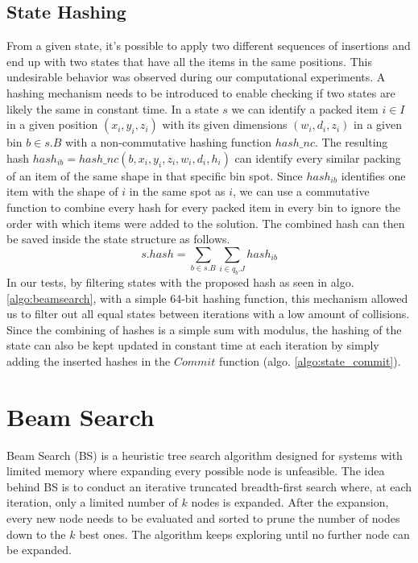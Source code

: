 \subsection{State Hashing}
\label{sec:state_uniqueness}%
From a given state, it's possible to apply two different sequences of insertions and end up with two states that have all the items in the same positions.
This undesirable behavior was observed during our computational experiments.
A hashing mechanism needs to be introduced to enable checking if two states are likely the same in constant time.
In a state $s$ we can identify a packed item $i \in I$ in a given position $(x_i, y_i, z_i)$ with its given dimensions $(w_i, d_i, z_i)$ in a given bin $b \in s.B$ with a non-commutative hashing function $hash\_nc$. 
The resulting hash $hash_{ib} = hash\_nc(b, x_i, y_i, z_i, w_i, d_i, h_i)$ can identify every similar packing of an item of the same shape in that specific bin spot.
Since $hash_{ib}$ identifies one item with the shape of $i$ in the same spot as $i$, we can use a commutative function to combine every hash for every packed item in every bin to ignore the order with which items were added to the solution.
The combined hash can then be saved inside the state structure as follows. 
\begin{equation}
    s.hash = \sum\limits_{b \in s.B}{\sum\limits_{i \in q_b.J}{hash_{ib}}}
\end{equation}
In our tests, by filtering states with the proposed hash as seen in algo. \ref{algo:beamsearch}, with a simple 64-bit hashing function, this mechanism allowed us to filter out all equal states between iterations with a low amount of collisions.
Since the combining of hashes is a simple sum with modulus, the hashing of the state can also be kept updated in constant time at each iteration by simply adding the inserted hashes in the $Commit$ function (algo. \ref{algo:state_commit}).

\section{Beam Search}
\label{sec:beamsearch}%
Beam Search (BS) is a heuristic tree search algorithm designed for systems with limited memory where expanding every possible node is unfeasible.
The idea behind BS is to conduct an iterative truncated breadth-first search where, at each iteration, only a limited number of $k$ nodes is expanded.
After the expansion, every new node needs to be evaluated and sorted to prune the number of nodes down to the $k$ best ones. The algorithm keeps exploring until no further node can be expanded.

